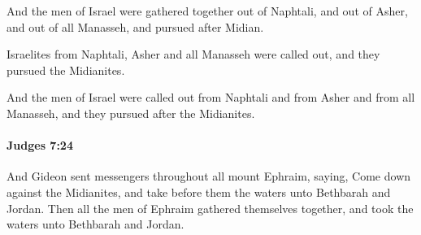 			\begin{versebox}
					\item[BHS] 
					\item[ASV] And the men of Israel were gathered together out of Naphtali, and out of Asher, and out of all Manasseh, and pursued after Midian.
					\item[NIV] Israelites from Naphtali, Asher and all Manasseh were called out, and they pursued the Midianites.
					\item[NRSV] And the men of Israel were called out from Naphtali and from Asher and from all Manasseh, and they pursued after the Midianites.
			\end{versebox}

		\paragraph{Judges 7:24} %
			\label{JUDGES-7-24}

			And Gideon sent messengers throughout all mount Ephraim, saying, Come down against the Midianites, and take before them the waters unto Bethbarah and Jordan. Then all the men of Ephraim gathered themselves together, and took the waters unto Bethbarah and Jordan.

